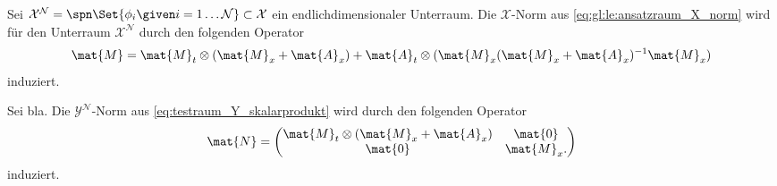 \begin{Lemma}
    Sei $\mathcal{X}^{\mathcal{N}} = \spn\Set{ \phi_{i} \given i = 1 \dots \mathcal N } \subset \mathcal X$ ein endlichdimensionaler Unterraum.
    Die $\mathcal X$-Norm aus \eqref{eq:gl:le:ansatzraum_X_norm}
    wird für den Unterraum $\mathcal{X}^{\mathcal N}$ durch den folgenden Operator
    \begin{equation}
        \mat{M} = \mat{M}_{t} \otimes (\mat{M}_{x} + \mat{A}_{x}) + \mat{A}_{t} \otimes (\mat{M}_{x} (\mat{M}_{x} + \mat{A}_{x})^{-1} \mat{M}_{x})
    \end{equation}
    induziert.
\end{Lemma}

\begin{Lemma}
    Sei bla.
    Die $\mathcal{Y}^{\mathcal N}$-Norm aus \eqref{eq:testraum_Y_skalarprodukt} wird durch den folgenden Operator
    \begin{equation}
        \mat{N} = \begin{pmatrix}
            \mat{M}_{t} \otimes (\mat{M}_{x} + \mat{A}_{x}) & \mat{0} \\
            \mat{0} & \mat{M}_{x}.
        \end{pmatrix}
    \end{equation}
    induziert.
\end{Lemma}


